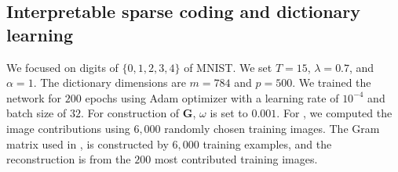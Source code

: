\documentclass[10pt]{article} %
\newcommand{\G}{{\bm G}}
\begin{document}
\subsection{Interpretable sparse coding and dictionary learning}
%
We focused on digits of $\{0,1,2,3,4\}$ of MNIST. We set $T=15$, $\lambda=0.7$, and $\alpha = 1$. The dictionary dimensions are $m = 784$ and $p = 500$. We trained the network for $200$ epochs using Adam optimizer with a learning rate of $10^{-4}$ and batch size of $32$. For construction of $\G$, $\omega$ is set to $0.001$. For , we computed the image contributions using $6{,}000$ randomly chosen training images. The Gram matrix used in , is constructed by $6{,}000$ training examples, and the reconstruction is from the $200$ most contributed training images.
\end{document}
